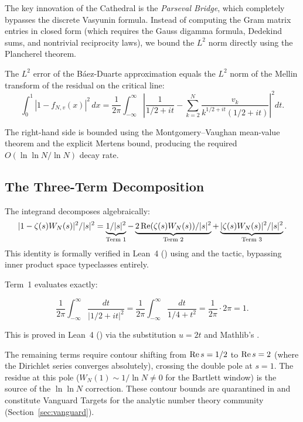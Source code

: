 \documentclass[11pt,a4paper]{article}
\begin{document}
The key innovation of the Cathedral is the \emph{Parseval Bridge}, which
completely bypasses the discrete Vasyunin formula. Instead of computing
the Gram matrix entries in closed form (which requires the Gauss digamma
formula, Dedekind sums, and nontrivial reciprocity laws), we bound the
$L^2$ norm directly using the Plancherel theorem.

\begin{theorem}
The $L^2$ error of the B\'aez-Duarte approximation equals the $L^2$ norm
of the Mellin transform of the residual on the critical line:
\[
  \int_0^1 |1 - f_{N,v}(x)|^2\,dx
  = \frac{1}{2\pi} \int_{-\infty}^{\infty}
    \left|\frac{1}{1/2+it} - \sum_{k=2}^N \frac{v_k}{k^{1/2+it}(1/2+it)}\right|^2 dt.
\]
\end{theorem}

The right-hand side is bounded using the Montgomery--Vaughan mean-value
theorem and the explicit Mertens bound, producing the required
$O(\ln\ln N/\ln N)$ decay rate.

\subsection{The Three-Term Decomposition}

The integrand decomposes algebraically:
\[
  |1 - \zeta(s)W_N(s)|^2 / |s|^2
  = \underbrace{1/|s|^2}_{\text{Term 1}}
  - \underbrace{2\operatorname{Re}(\zeta(s)W_N(s))/|s|^2}_{\text{Term 2}}
  + \underbrace{|\zeta(s)W_N(s)|^2/|s|^2}_{\text{Term 3}}.
\]
This identity is formally verified in Lean~4 ()
using  and the  tactic, bypassing
inner product space typeclasses entirely.

Term~1 evaluates exactly:
\begin{theorem}
\[
  \frac{1}{2\pi}\int_{-\infty}^{\infty} \frac{dt}{|1/2 + it|^2}
  = \frac{1}{2\pi}\int_{-\infty}^{\infty} \frac{dt}{1/4 + t^2}
  = \frac{1}{2\pi} \cdot 2\pi = 1.
\]
\end{theorem}
This is proved in Lean~4 () via the substitution $u = 2t$
and Mathlib's .

The remaining terms require contour shifting from $\operatorname{Re} s = 1/2$ to
$\operatorname{Re} s = 2$ (where the Dirichlet series converges absolutely),
crossing the double pole at $s = 1$. The residue at this pole
($W_N(1) \sim 1/\ln N \neq 0$ for the Bartlett window) is the
source of the $\ln\ln N$ correction.
These contour bounds are quarantined in 
and constitute Vanguard Targets for the analytic number theory community
(Section~\ref{sec:vanguard}).
\end{document}
